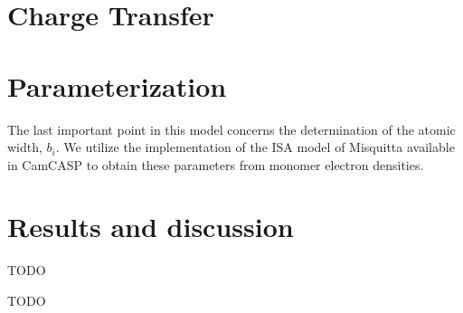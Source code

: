 \documentclass[journal=jacsat,manuscript=article]{achemso}
\begin{document}
\section*{Charge Transfer}

\section*{Parameterization}

The last important point in this model concerns the determination of the
atomic width, $b_i$. We utilize the implementation of the ISA model of
Misquitta\cite{misquitta2014distributed} available in CamCASP\cite{misquitta2016ab}
to obtain these parameters from monomer electron densities.

\section*{Results and discussion}



\begin{acknowledgement}

TODO

\end{acknowledgement}

\begin{suppinfo}

TODO

\end{suppinfo}


\end{document}
